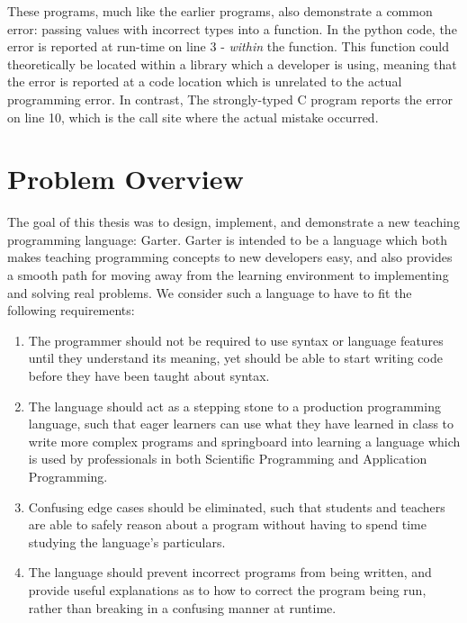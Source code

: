 \begin{minipage}[t]{0.5\textwidth}

\end{minipage}
\begin{minipage}[t]{0.5\textwidth}

\end{minipage}

These programs, much like the earlier programs, also demonstrate a common error:
passing values with incorrect types into a function. In the python code, the
error is reported at run-time on line 3 - \emph{within} the function. This
function could theoretically be located within a library which a developer is
using, meaning that the error is reported at a code location which is unrelated
to the actual programming error. In contrast, The strongly-typed C program
reports the error on line 10, which is the call site where the actual mistake
occurred.


\section{Problem Overview}

The goal of this thesis was to design, implement, and demonstrate a new teaching
programming language: Garter. Garter is intended to be a language which both
makes teaching programming concepts to new developers easy, and also provides
a smooth path for moving away from the learning environment to implementing and
solving real problems. We consider such a language to have to fit the following
requirements:

\begin{enumerate}
\item The programmer should not be required to use syntax or language features
until they understand its meaning, yet should be able to start writing code
before they have been taught about syntax.
\item The language should act as a stepping stone to a production programming
language, such that eager learners can use what they have learned in class to
write more complex programs and springboard into learning a language which is
used by professionals in both Scientific Programming and Application Programming.
\item Confusing edge cases should be eliminated, such that students and teachers
are able to safely reason about a program without having to spend time studying
the language's particulars.
\item The language should prevent incorrect programs from being written, and
provide useful explanations as to how to correct the program being run, rather
than breaking in a confusing manner at runtime.
\end{enumerate}

